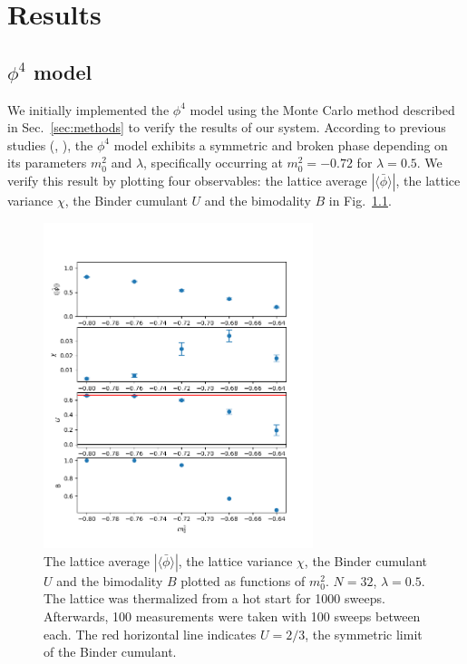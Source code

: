 \documentclass[12pt]{report}
\begin{document}
\chapter{Results}
\section{$\phi^4$ model}

We initially implemented the $\phi^4$ model using the Monte Carlo method described in Sec.~\ref{sec:methods} to verify the results of our system. According to previous studies (\cite{monahan2016}, \cite{schaich2006}), the $\phi^4$ model exhibits a symmetric and broken phase depending on its parameters $m_0^2$ and $\lambda$, specifically occurring at $m_0^2 = -0.72$ for $\lambda = 0.5$. We verify this result by plotting four observables: the lattice average $|\langle\bar\phi\rangle|$, the lattice variance $\chi$, the Binder cumulant $U$ and the bimodality $B$ in Fig.~\ref{fig:phi4}.

\begin{figure}[h]
  \centering
      \includegraphics[width=0.7\textwidth]{imgs/phi4.png}
      \caption{The lattice average $|\langle\bar\phi\rangle|$, the lattice variance $\chi$, the Binder cumulant $U$ and the bimodality $B$ plotted as functions of $m_0^2$. $N=32$, $\lambda=0.5$. The lattice was thermalized from a hot start for 1000 sweeps. Afterwards, 100 measurements were taken with 100 sweeps between each. The red horizontal line indicates $U=2/3$, the symmetric limit of the Binder cumulant.}
  \label{fig:phi4}
\end{figure}
\end{document}
